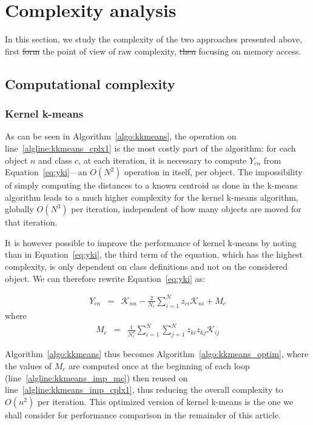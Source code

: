 \documentclass[natbib,smallextended]{svjour3}
\newcommand{\cad}{---} %
\providecommand{\DIFaddtex}[1]{{\protect\color{blue}\uwave{#1}}} %
\providecommand{\DIFdeltex}[1]{{\protect\color{red}\sout{#1}}}                      %
\providecommand{\DIFaddbegin}{} %
\providecommand{\DIFaddend}{} %
\providecommand{\DIFdelbegin}{} %
\providecommand{\DIFdelend}{} %
\providecommand{\DIFadd}[1]{\texorpdfstring{\DIFaddtex{#1}}{#1}} %
\providecommand{\DIFdel}[1]{\texorpdfstring{\DIFdeltex{#1}}{}} %
\begin{document}
\section{Complexity analysis}
\label{sec:complexity}

In this section, we study the complexity of the two approaches presented above, first \DIFdelbegin \DIFdel{form }\DIFdelend \DIFaddbegin \DIFadd{from }\DIFaddend the point of view of raw complexity, \DIFdelbegin \DIFdel{then }\DIFdelend \DIFaddbegin \DIFadd{second by }\DIFaddend focusing on memory access.

\subsection{Computational complexity}

\subsubsection{Kernel k-means}

As can be seen in Algorithm~\ref{algo:kkmeans}, the operation on line~\ref{algline:kkmeans_cplx1} is the most costly part of the algorithm: for each object $n$ and class $c$, at each iteration, it is necessary to compute $Y_{cn}$ from Equation~\ref{eq:yki}\cad{}an $O(N^2)$ operation in itself, per object. The impossibility of simply computing the distances to a known centroid as done in the k-means algorithm leads to a much higher complexity for the kernel k-means algorithm, globally $O(N^3)$ per iteration, independent of how many objects are moved for that iteration.

It is however possible to improve the performance of kernel k-means by noting than in Equation~\ref{eq:yki}, the third term of the equation, which has the highest complexity, is only dependent on class definitions and not on the considered object. We can therefore rewrite Equation~\ref{eq:yki} as:

\begin{eqnarray}
Y_{cn} & = & \mathcal{K}_{nn} - \frac{2}{N_c} \sum_{i=1}^{N} z_{ci} \mathcal{K}_{ni} + M_c \label{eq:yki_improved}
\end{eqnarray}
where
\begin{eqnarray}
M_c    & = & \frac{1}{N_c^2} \sum_{i=1}^{N} \sum_{j=1}^{N} z_{ki} z_{kj} \mathcal{K}_{ij} \label{eq:mc}
\end{eqnarray}

Algorithm~\ref{algo:kkmeans} thus becomes Algorithm~\ref{algo:kkmeans_optim}, where the values of $M_c$ are computed once at the beginning of each loop (line~\ref{algline:kkmeans_imp_mc}) then reused on line~\ref{algline:kkmeans_imp_cplx1}, thus reducing the overall complexity to $O(n^2)$ per iteration. This optimized version of kernel k-means is the one we shall consider for performance comparison in the remainder of this article.
\end{document}

